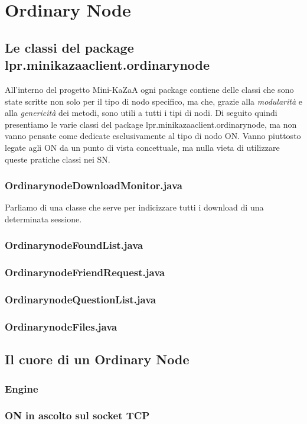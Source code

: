 \chapter{Ordinary Node}
\section{Le classi del package lpr.minikazaaclient.ordinarynode}
All'interno del progetto Mini-KaZaA ogni package contiene delle classi che sono state scritte non solo per il tipo di nodo specifico, ma che, grazie alla \emph{modularità} e alla \emph{genericità} dei metodi, sono utili a tutti i tipi di nodi.
Di seguito quindi presentiamo le varie classi del package lpr.minikazaaclient.ordinarynode, ma non vanno pensate come dedicate esclusivamente al tipo di nodo ON. Vanno piuttosto legate agli ON da un punto di vista concettuale, ma nulla vieta di utilizzare queste pratiche classi nei SN.
\subsection{OrdinarynodeDownloadMonitor.java}
Parliamo di una classe che serve per indicizzare tutti i download di una determinata sessione.
\subsection{OrdinarynodeFoundList.java}
\subsection{OrdinarynodeFriendRequest.java}
\subsection{OrdinarynodeQuestionList.java}
\subsection{OrdinarynodeFiles.java}\label{sec:on_files}

\section{Il cuore di un Ordinary Node}
\subsection{Engine}
\subsection{ON in ascolto sul socket TCP}
